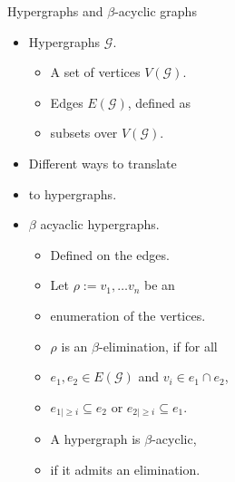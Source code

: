 \begin{frame}[t]{Hypergraphs and $\beta$-acyclic graphs}
	\begin{minipage}{.59\linewidth}
	\begin{itemize}
		\item Hypergraphs $\mathcal{G}$.
			\begin{itemize}
				\item A set of vertices $V(\mathcal{G})$.
				\item Edges $E(\mathcal{G})$, defined as 
				\item[] subsets over $V(\mathcal{G})$.
			\end{itemize}
		\item Different ways to translate
		\item[] \hspace{1cm} to hypergraphs.
		\item $\beta$ acyaclic hypergraphs.
			\begin{itemize}
				\item Defined on the edges.
				\item Let $\rho := v_1, \dots v_n$ be an
				\item[] \hspace{1cm}enumeration of the vertices.
				\item $\rho$ is an $\beta$-elimination, if for all
				\item[] \hspace{1cm}$e_1, e_2 \in E(\mathcal{G})$ and $v_i \in e_1 \cap e_2$,
				\item[]\hspace{1cm}$e_{1|\geq i} \subseteq e_2$ or $e_{2|\geq i} \subseteq e_1$.
				\item A hypergraph is $\beta$-acyclic,
				\item[] \hspace{1cm} if it admits an elimination.

			\end{itemize}
	\end{itemize}
\end{minipage}
\begin{minipage}{.39\linewidth}
\centering

\end{minipage}
\end{frame}

